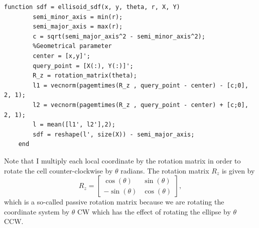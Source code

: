 \begin{lstlisting}[style=Matlab-editor]
    function sdf = ellisoid_sdf(x, y, theta, r, X, Y)
        semi_minor_axis = min(r);
        semi_major_axis = max(r);
        c = sqrt(semi_major_axis^2 - semi_minor_axis^2);
        %Geometrical parameter
        center = [x,y]';
        query_point = [X(:), Y(:)]';
        R_z = rotation_matrix(theta);
        l1 = vecnorm(pagemtimes(R_z , query_point - center) - [c;0], 2, 1);
        l2 = vecnorm(pagemtimes(R_z , query_point - center) + [c;0], 2, 1);
        l = mean([l1', l2'],2);
        sdf = reshape(l', size(X)) - semi_major_axis;
    end 
\end{lstlisting}
Note that I multiply each local coordinate  by the rotation matrix  in order
to rotate the cell counter-clockwise by $\theta$ radians. The rotation matrix $R_z$ is given by
\begin{equation}
    R_z = \begin{bmatrix}
            \cos{(\theta)} & \sin{(\theta)}\\
            -\sin{(\theta)} & \cos{(\theta)} 
        \end{bmatrix} ,
\end{equation}
which is a so-called passive rotation matrix because we are rotating the coordinate system by $\theta$ CW which has the effect 
of rotating the ellipse by $\theta$ CCW.


